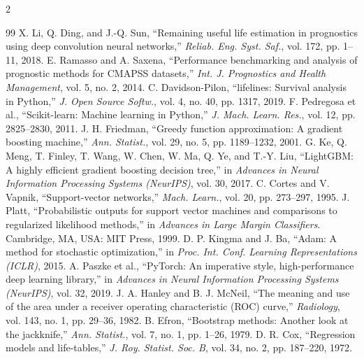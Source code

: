 \begin{multicols}{2}
\begin{thebibliography}{99}
 X. Li, Q. Ding, and J.-Q. Sun, ``Remaining useful life estimation in prognostics using deep convolution neural networks,'' \emph{Reliab. Eng. Syst. Saf.}, vol. 172, pp. 1–11, 2018.
 E. Ramasso and A. Saxena, ``Performance benchmarking and analysis of prognostic methods for CMAPSS datasets,'' \emph{Int. J. Prognostics and Health Management}, vol. 5, no. 2, 2014.
 C. Davidson-Pilon, ``lifelines: Survival analysis in Python,'' \emph{J. Open Source Softw.}, vol. 4, no. 40, pp. 1317, 2019.
 F. Pedregosa et al., ``Scikit-learn: Machine learning in Python,'' \emph{J. Mach. Learn. Res.}, vol. 12, pp. 2825–2830, 2011.
 J. H. Friedman, ``Greedy function approximation: A gradient boosting machine,'' \emph{Ann. Statist.}, vol. 29, no. 5, pp. 1189–1232, 2001.
 G. Ke, Q. Meng, T. Finley, T. Wang, W. Chen, W. Ma, Q. Ye, and T.-Y. Liu, ``LightGBM: A highly efficient gradient boosting decision tree,'' in \emph{Advances in Neural Information Processing Systems (NeurIPS)}, vol. 30, 2017.
 C. Cortes and V. Vapnik, ``Support-vector networks,'' \emph{Mach. Learn.}, vol. 20, pp. 273–297, 1995.
 J. Platt, ``Probabilistic outputs for support vector machines and comparisons to regularized likelihood methods,'' in \emph{Advances in Large Margin Classifiers}. Cambridge, MA, USA: MIT Press, 1999.
 D. P. Kingma and J. Ba, ``Adam: A method for stochastic optimization,'' in \emph{Proc. Int. Conf. Learning Representations (ICLR)}, 2015.
 A. Paszke et al., ``PyTorch: An imperative style, high-performance deep learning library,'' in \emph{Advances in Neural Information Processing Systems (NeurIPS)}, vol. 32, 2019.
 J. A. Hanley and B. J. McNeil, ``The meaning and use of the area under a receiver operating characteristic (ROC) curve,'' \emph{Radiology}, vol. 143, no. 1, pp. 29–36, 1982.
 B. Efron, ``Bootstrap methods: Another look at the jackknife,'' \emph{Ann. Statist.}, vol. 7, no. 1, pp. 1–26, 1979.
 D. R. Cox, ``Regression models and life-tables,'' \emph{J. Roy. Statist. Soc. B}, vol. 34, no. 2, pp. 187–220, 1972.
\end{thebibliography}
\endgroup
\end{multicols}
